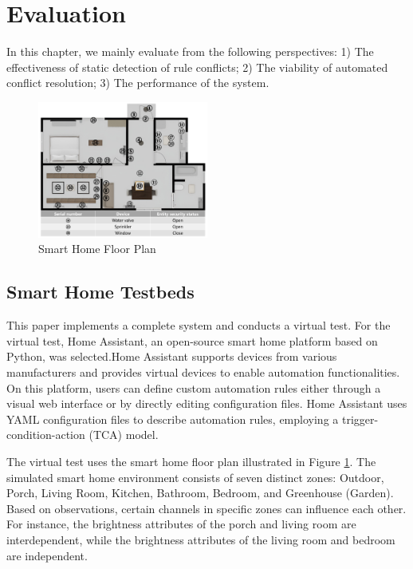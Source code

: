 \section{Evaluation}
In this chapter, we mainly evaluate from the following perspectives: 1) The effectiveness of static detection of rule conflicts; 2) The viability of automated conflict resolution; 3) The performance of the system.

\begin{figure}[htbp]
	\centering
	\includegraphics[width=0.5\textwidth]{figure/smarthome.png}
	\caption{Smart Home Floor Plan}
	\label{smarthome_floorplan}
\end{figure}

\subsection{Smart Home Testbeds}

This paper implements a complete system and conducts a virtual test. For the virtual test, Home Assistant, an open-source smart home platform based on Python, was selected.Home Assistant supports devices from various manufacturers and provides virtual devices to enable automation functionalities. On this platform, users can define custom automation rules either through a visual web interface or by directly editing configuration files. Home Assistant uses YAML configuration files to describe automation rules, employing a trigger-condition-action (TCA) model.

The virtual test uses the smart home floor plan illustrated in Figure \ref{smarthome_floorplan}. The simulated smart home environment consists of seven distinct zones: Outdoor, Porch, Living Room, Kitchen, Bathroom, Bedroom, and Greenhouse (Garden).  Based on observations, certain channels in specific zones can influence each other. For instance, the brightness attributes of the porch and living room are interdependent, while the brightness attributes of the living room and bedroom are independent.

